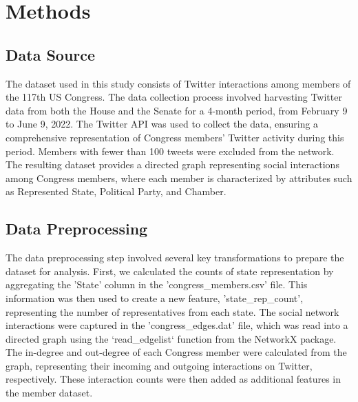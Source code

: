 \documentclass[11pt]{article}
\begin{document}
\section*{Methods}

\subsection*{Data Source}
The dataset used in this study consists of Twitter interactions among members of the 117th US Congress. The data collection process involved harvesting Twitter data from both the House and the Senate for a 4-month period, from February 9 to June 9, 2022. The Twitter API was used to collect the data, ensuring a comprehensive representation of Congress members' Twitter activity during this period. Members with fewer than 100 tweets were excluded from the network. The resulting dataset provides a directed graph representing social interactions among Congress members, where each member is characterized by attributes such as Represented State, Political Party, and Chamber.

\subsection*{Data Preprocessing}
The data preprocessing step involved several key transformations to prepare the dataset for analysis. First, we calculated the counts of state representation by aggregating the 'State' column in the 'congress\_members.csv' file. This information was then used to create a new feature, 'state\_rep\_count', representing the number of representatives from each state. The social network interactions were captured in the 'congress\_edges.dat' file, which was read into a directed graph using the `read\_edgelist` function from the NetworkX package. The in-degree and out-degree of each Congress member were calculated from the graph, representing their incoming and outgoing interactions on Twitter, respectively. These interaction counts were then added as additional features in the member dataset.
\end{document}
